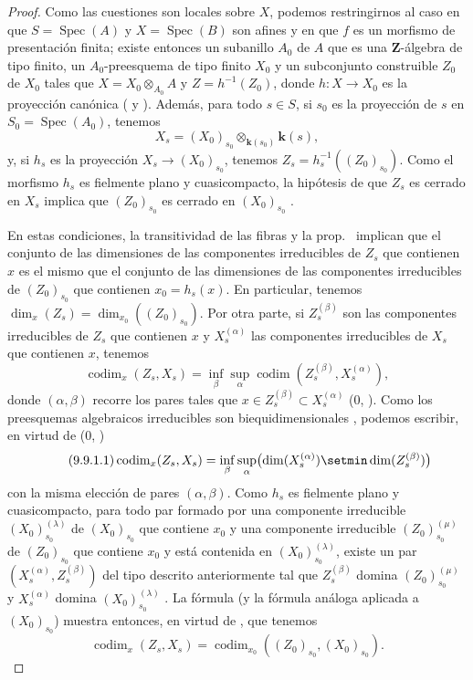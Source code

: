\begin{proof}
\label{IV.9.9.1-proof}
Como las cuestiones son locales sobre $X$, podemos restringirnos al caso en que $S=\operatorname{Spec}(A)$ y $X=\operatorname{Spec}(B)$ son afines y en que $f$ es un morfismo de presentación finita; existe entonces un subanillo $A_0$ de $A$ que es una $\mathbf{Z}$-álgebra de tipo finito, un $A_0$-preesquema de tipo finito $X_0$ y un subconjunto construible $Z_0$ de $X_0$ tales que $X=X_0\otimes_{A_0}A$ y $Z=h^{-1}(Z_0)$, donde $h:X\to X_0$ es la proyección canónica ( y ).
Además, para todo $s\in S$, si $s_0$ es la proyección de $s$ en $S_0=\operatorname{Spec}(A_0)$, tenemos
\[
  X_s=(X_0)_{s_0}\otimes_{\mathbf{k}(s_0)}\boldsymbol{k}(s),
\]
y, si $h_s$ es la proyección $X_s\to(X_0)_{s_0}$, tenemos $Z_s=h_s^{-1}((Z_0)_{s_0})$.
Como el morfismo $h_s$ es fielmente plano y cuasicompacto, la hipótesis de que $Z_s$ es cerrado en $X_s$ implica que $(Z_0)_{s_0}$ es cerrado en $(X_0)_{s_0}$ .

En estas condiciones, la transitividad de las fibras  y la prop.~ implican que el conjunto de las dimensiones de las componentes irreducibles de $Z_s$ que contienen $x$ es el mismo que el conjunto de las dimensiones de las componentes irreducibles de $(Z_0)_{s_0}$ que contienen $x_0=h_s(x)$.
En particular, tenemos $\dim_x(Z_s)=\dim_{x_0}((Z_0)_{s_0})$.
Por otra parte, si $Z_s^{(\beta)}$ son las componentes irreducibles de $Z_s$ que contienen $x$ y $X_s^{(\alpha)}$ las componentes irreducibles de $X_s$
que contienen $x$, tenemos
\[
  \operatorname{codim}_x(Z_s,X_s)
  =\inf_{\beta}\sup_{\alpha}\operatorname{codim}(Z_s^{(\beta)},X_s^{(\alpha)}),
\]
donde $(\alpha,\beta)$ recorre los pares tales que $x\in Z_s^{(\beta)}\subset X_s^{(\alpha)}$ ($0$, ).
Como los preesquemas algebraicos irreducibles son biequidimensionales , podemos escribir, en virtud de ($0$, )
\begin{equation}
\tag{9.9.1.1}
\label{IV.9.9.1.1}
  \operatorname{codim}_x(Z_s,X_s)=\inf_{\beta}\sup_{\alpha}\bigl(\dim(X_s^{(\alpha)})\setmin\dim(Z_s^{(\beta)})\bigr)
\end{equation}
con la misma elección de pares $(\alpha,\beta)$.
Como $h_s$ es fielmente plano y cuasicompacto, para todo par formado por una componente irreducible $(X_0)_{s_0}^{(\lambda)}$ de $(X_0)_{s_0}$ que contiene $x_0$ y una componente irreducible $(Z_0)_{s_0}^{(\mu)}$ de $(Z_0)_{s_0}$ que contiene $x_0$ y está contenida en $(X_0)_{s_0}^{(\lambda)}$, existe un par $(X_s^{(\alpha)},Z_s^{(\beta)})$ del tipo descrito anteriormente tal que $Z_s^{(\beta)}$ domina $(Z_0)_{s_0}^{(\mu)}$ y $X_s^{(\alpha)}$ domina $(X_0)_{s_0}^{(\lambda)}$ .
La fórmula  (y la fórmula análoga aplicada a $(X_0)_{s_0}$) muestra entonces, en virtud de , que tenemos
\[
  \operatorname{codim}_x(Z_s,X_s)=\operatorname{codim}_{x_0}((Z_0)_{s_0},(X_0)_{s_0}).
\]


\end{proof}
